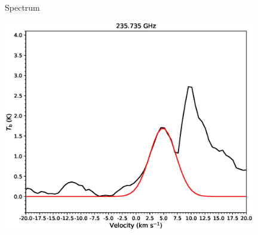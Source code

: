 \begin{figure}[htbp]
\begin{center}
\begin{minipage}{0.98\textwidth}
\begin{center}
\begin{minipage}{0.48\textwidth}
\begin{center}
\end{center}
\end{minipage}
\end{center}
\end{minipage}

\caption{Spectrum }
\end{center}
\end{figure}

\begin{figure}[htbp] 
\begin{center}
\begin{minipage}{0.98\textwidth} 
\begin{center}
\begin{minipage}{0.48\textwidth}
\begin{center}
\includegraphics[width=0.98\textwidth]{OrionKL/spectrum/HC/235.735037w_fit.eps}
\end{center}
\end{minipage}
\begin{minipage}{0.48\textwidth}
\begin{center}

\end{center}
\end{minipage}
\end{center}
\end{minipage}
\end{center}
\end{figure}
